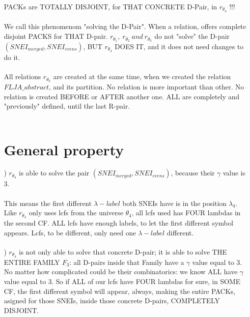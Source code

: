 	\noindent
	PACKs are TOTALLY DISJOINT, for THAT CONCRETE D-Pair, in $r_{\theta_{4}}$ !!!
	\\\\
	
	\noindent
	We call this phenomenom "solving the D-Pair". When a relation, offers complete disjoint PACKS for THAT D-pair. $r_{\theta_{1}},\:r_{\theta_{2}}\: and \:r_{\theta_{3}}$ do not "solve" the D-pair $(SNEI_{merged}, SNEI_{evens})$, BUT $r_{\theta_{4}}$ DOES IT, and it does not need changes to do it.
	\\\\
	
	\noindent
	All relations $r_{\theta_{k}}$ are created at the same time, when we created the relation $FLJA\_abstract$, and its partition. No relation is more important than other. No relation is created BEFORE or AFTER another one. ALL are completely and "previously" defined, until the last R-pair.
	\\\\
	
	\newpage
	\section{General property}
	
		) $r_{\theta_{4}}$ is able to solve the pair $(SNEI_{merged}, SNEI_{evens})$, because their $\gamma$ value is 3.\\\\
		This means the first different $\lambda-label$ both SNEIs have is in the position $\lambda_{4}$. Like $r_{\theta_{4}}$ only uses lcfs from the universe $\theta_{4}$, all lcfs used has FOUR lambdas in the second CF. ALL lcfs have enough labels, to let the first different symbol appears. Lcfs, to be different, only need one $\lambda-label$ different.
		\\\\
		
		) $r_{\theta_{4}}$ is not only able to solve that concrete D-pair; it is able to solve THE ENTIRE FAMILY $F_{3}$: all D-pairs inside that Family have a $\gamma$ value equal to 3. No matter how complicated could be their combinatorics: we know ALL have $\gamma$ value equal to 3. So if ALL of our lcfs have FOUR lambdas for sure, in SOME CF, the first different symbol will appear, always, making the entire PACKs, asigned for those SNEIs, inside those concrete D-pairs, COMPLETELY DISJOINT.
		\\\\
		
